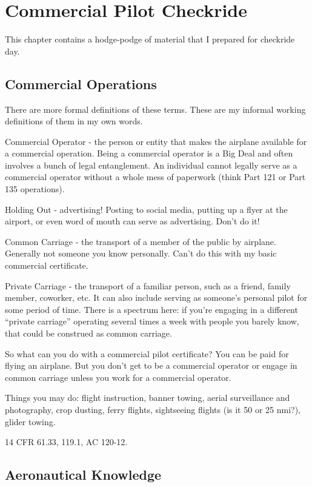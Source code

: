 \chapter{Commercial Pilot Checkride}

This chapter contains a hodge-podge of material that I prepared for checkride day.

\section{Commercial Operations}

There are more formal definitions of these terms. These are my informal working definitions of them in my own words.

Commercial Operator - the person or entity that makes the airplane available for a commercial operation. Being a commercial operator is a Big Deal and often involves a bunch of legal entanglement. An individual cannot legally serve as a commercial operator without a whole mess of paperwork (think Part 121 or Part 135 operations).

Holding Out - advertising! Posting to social media, putting up a flyer at the airport, or even word of mouth can serve as advertising. Don't do it!

Common Carriage - the transport of a member of the public by airplane. Generally not someone you know personally. Can't do this with my basic commercial certificate.

Private Carriage - the transport of a familiar person, such as a friend, family member, coworker, etc. It can also include serving as someone's personal pilot for some period of time. There is a spectrum here: if you're engaging in a different ``private carriage'' operating several times a week with people you barely know, that could be construed as common carriage.

So what can you do with a commercial pilot certificate? You can be paid for flying an airplane. But you don't get to be a commercial operator or engage in common carriage unless you work for a commercial operator.

Things you may do: flight instruction, banner towing, aerial surveillance and photography, crop dusting, ferry flights, sightseeing flights (is it 50 or 25 nmi?), glider towing.

14 CFR 61.33, 119.1, AC 120-12.

\section{Aeronautical Knowledge}

